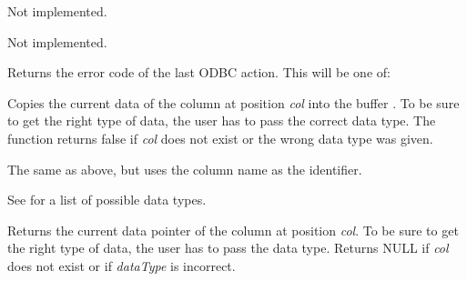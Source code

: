 

Not implemented.



Not implemented.



Returns the error code of the last ODBC action. This will be one of:

\begin{twocollist}\itemsep=0pt
\end{twocollist}

\label{wxrecordsetgetfielddata}


Copies the current data of the column at position {\it col} into the buffer
. To be sure to get the right type of data, the user has to pass the
correct data type. The function returns false if {\it col} does not
exist or the wrong data type was given.


The same as above, but uses the column name as the identifier.

See  for a list
of possible data types.

\label{wxrecordsetgetfielddataptr}


Returns the current data pointer of the column at position {\it col}.
To be sure to get the right type of data, the user has to pass the
data type. Returns NULL if {\it col} does not exist or if {\it dataType} is
incorrect.

